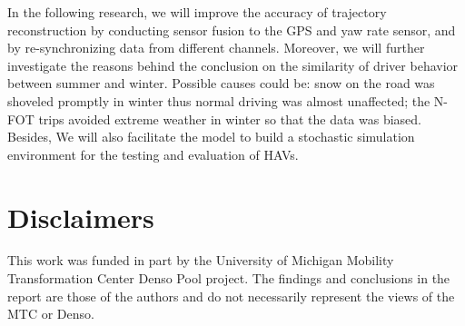 \documentclass[letterpaper, 10 pt, conference]{ieeeconf}
\begin{document}
In the following research, we will improve the accuracy of trajectory reconstruction by conducting sensor fusion to the GPS and yaw rate sensor, and by re-synchronizing data from different channels. Moreover, we will further investigate the reasons behind the conclusion on the similarity of driver behavior between summer and winter. Possible causes could be: snow on the road was shoveled promptly in winter thus normal driving was almost unaffected; the N-FOT trips avoided extreme weather in winter so that the data was biased. Besides, We will also facilitate the model to build a stochastic simulation environment for the testing and evaluation of HAVs.




\section*{Disclaimers}

This work was funded in part by the University of Michigan Mobility Transformation Center Denso Pool project. The findings and conclusions in the report are those of the authors and do not necessarily represent the views of the MTC or Denso.

\addtolength{\textheight}{-12cm}   %





%
\end{document}
